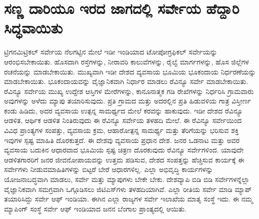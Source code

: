 
\chapter{ಸಣ್ಣ ದಾರಿಯೂ ಇರದ ಜಾಗದಲ್ಲಿ ಸರ್ವೇಯ ಹೆದ್ದಾರಿ ಸಿದ್ಧವಾಯಿತು}

\vskip 7pt

ಟ್ರಿಗನಮಿಟ್ರಿಕಲ್​ ಸರ್ವೇಯ ನೆಲಗಟ್ಟಿನ ಮೇಲೆ ಇಡೀ ಇಂಡಿಯಾದ ಟೋಪೋಗ್ರಫಿಕಲ್​ ಸರ್ವೇಯನ್ನು ಆರಂಭಿಸಬೇಕಾಯಿತು. ಹೊಸದಾಗಿ ರಸ್ತೆಗಳನ್ನು, ನೀರಾವರಿ ಕಾಲುವೆಗಳನ್ನು, ರೈಲ್ವೆ ಮಾರ್ಗಗಳನ್ನು, ಹೊಸ ಜಿಲ್ಲೆಗಳ ರಚನೆಯನ್ನು ಮಾಡಬೇಕಾಯಿತು. ಮುಖ್ಯವಾಗಿ ಇಡೀ ದೇಶದ ವ್ಯವಸಾಯ ಭೂಮಿಯ ಭೂಕಂದಾಯ ನಿರ್ಧರಣೆಯನ್ನು ಮಾಡಬೇಕಾಯಿತು. ಭೂಕಂದಾಯವನ್ನು ವೈಜ್ಞಾನಿಕವಾಗಿ ನಿರ್ಧಾರ ಮಾಡಲು ರೆವಿನ್ಯೂ ಸರ್ವೇ ಮಾಡಬೇಕಾಯಿತು. ರೆವಿನ್ಯೂ ಸರ್ವೇಯ ಮುಖ್ಯ ಉದ್ದೇಶ ಆಸ್ತಿಗಳ ಮೇರೆಗಳನ್ನು, ಕಾನೂನಾತ್ಮಕ ಗಡಿ ರೇಖೆಗಳನ್ನು ನಿರ್ಧರಿಸಿ ಗ್ರಾಮವಾರು ಅವುಗಳನ್ನು ಅಳೆದು ಮ್ಯಾಪು ತಯಾರಿಸುವುದು. ಪ್ರತಿ ಗ್ರಾಮದ ಮತ್ತು ಅದರಲ್ಲಿನ ಪ್ರತಿ ಹಿಡುವಳಿಯ ಗಾತ್ರ ವಿಸ್ತೀರ್ಣ ಕಂಡು ಹಿಡಿದು, ಅದರ ವ್ಯವಸಾಯ ಉತ್ಪನ್ನ ಸಾಮರ್ಥ್ಯದ ಮೇಲೆ ಕರವನ್ನು ಹಾಕುವುದು. ಇಡೀ ದೇಶದ ರೆವಿನ್ಯೂ ಆಡಳಿತ, ಆರ್ಥಿಕ ಆಡಳಿತ ನಿಂತಿರುವುದು ಈ ರೆವಿನ್ಯೂ ಸರ್ವೇಯ ತಳಹದಿ ಮೇಲೆ. ಈ ರೆವಿನ್ಯೂ ಸರ್ವೇಯಿಂದ ವಿವಿಧ ಪ್ರಾಂತ್ಯಗಳ ಸಂಪತ್ತು, ವ್ಯವಸಾಯ ಕ್ರಮ, ಆಹಾರೋತ್ಪನ್ನ ಸಾಮರ್ಥ್ಯ ಮತ್ತು ತೆರಿಗೆಯನ್ನು ಭರಿಸುವ ಶಕ್ತಿ ಇವುಗಳ ಸ್ಪಷ್ಟ ಮಾಹಿತಿ ದೊರಕುತ್ತದೆ. ಈ ದೇಶವು ವ್ಯವಸಾಯ ಪ್ರಧಾನ ದೇಶ. ಜನರ ಒಡನಾಟ ಮತ್ತು ಅವರ ವ್ಯವಸಾಯ ಬದುಕಿನ ಆಧಾರವಾದ ಭೂಮಿಯ ಸ್ಪಷ್ಟ ಚಿತ್ರಣ ದೊರಕುವುದು ರೆವಿನ್ಯೂ ಸರ್ವೇಗಳಿಂದ. ಯಾವುದೇ ಆಡಳಿತಗಾರರಿಗೆ ಜನರ ಜೀವನೋಪಾಯವನ್ನು ಉತ್ತಮ ಪಡಿಸುವ, ದೇಶದ ಸಂಪತ್ತನ್ನು ಹೆಚ್ಚಿಸುವ ಕಾರ್ಯಕ್ಕೆ ಈ ಸರ್ವೇಗಳು ನೀಡುವ\break ಮಾಹಿತಿಗಳನ್ನು ಬಿಟ್ಟರೆ ಬೇರೆ ಆಧಾರಗಳಿಲ್ಲ. ಎಲ್ಲಾ ಅಭಿವೃದ್ಧಿ ಕಾರ್ಯಗಳನ್ನು ಯೋಜನಾಬದ್ಧವಾಗಿ ಮಾಡಲು, ಸರ್ವೇ ಮತ್ತು ಮ್ಯಾಪುಗಳು ಬೇಕೇ ಬೇಕು. ದೇಶವ್ಯಾಪಿ ಬಿಡಿ ಬಿಡಿ ಸರ್ವೇಗಳನ್ನೆಲ್ಲಾ ವೈಜ್ಞಾನಿಕವಾಗಿ ಸಮಗ್ರವಾಗಿ ಒಗ್ಗೂಡಿಸಲು ಜಿಟಿಎಸ್​ಗಳು ತಳಹದಿಯಾಗಿವೆ. ಎಲ್ಲಾ ರೀತಿಯ ಸರ್ವೇ ಮಾಡಿ ಮ್ಯಾಪ್​ ತಯಾರಿಸಿದ್ದು ಸರ್ವೇ ಆಫ್​ ಇಂಡಿಯಾ. ಈಗಿನ ಎಲ್ಲಾ ರಾಜ್ಯಗಳ ಸರ್ವೇ ಇಲಾಖೆಯ ಮಾತೃ ಸಂಸ್ಥೆ ಇದು. ಈ ನಮ್ಮ ಮ್ಯಾಪಿಂಗ್​ ಸಂಸ್ಥೆ ಸರ್ವೇ ಆಫ್​ ಇಂಡಿಯಾದ ಜನನ ಬೆಂಗಾಲ ಪ್ರಾಂತ್ಯದಲ್ಲಿ ಆಯಿತು.

\vskip 4pt

